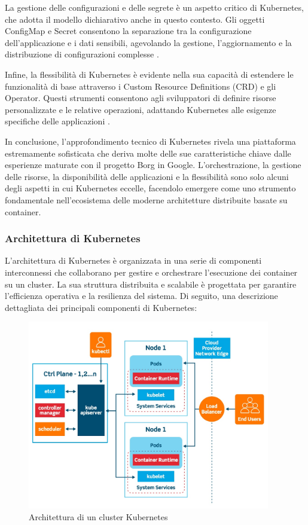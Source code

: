 La gestione delle configurazioni e delle segrete è un aspetto critico di Kubernetes, che adotta il modello dichiarativo anche in questo contesto. Gli oggetti ConfigMap e Secret consentono la separazione tra la configurazione dell'applicazione e i dati sensibili, agevolando la gestione, l'aggiornamento e la distribuzione di configurazioni complesse \cite{hightower2017kubernetes}.

Infine, la flessibilità di Kubernetes è evidente nella sua capacità di estendere le funzionalità di base attraverso i Custom Resource Definitions (CRD) e gli Operator. Questi strumenti consentono agli sviluppatori di definire risorse personalizzate e le relative operazioni, adattando Kubernetes alle esigenze specifiche delle applicazioni \cite{burns2016borg}.

In conclusione, l'approfondimento tecnico di Kubernetes rivela una piattaforma estremamente sofisticata che deriva molte delle sue caratteristiche chiave dalle esperienze maturate con il progetto Borg in Google. L'orchestrazione, la gestione delle risorse, la disponibilità delle applicazioni e la flessibilità sono solo alcuni degli aspetti in cui Kubernetes eccelle, facendolo emergere come uno strumento fondamentale nell'ecosistema delle moderne architetture distribuite basate su container.

\subsubsection{Architettura di Kubernetes}

L'architettura di Kubernetes è organizzata in una serie di componenti interconnessi che collaborano per gestire e orchestrare l'esecuzione dei container su un cluster. La sua struttura distribuita e scalabile è progettata per garantire l'efficienza operativa e la resilienza del sistema. Di seguito, una descrizione dettagliata dei principali componenti di Kubernetes:

\begin{figure}[h]
    \centering
    \includegraphics[width=400px]{figures/ch3/kube-arch.jpg}
    \caption[Architettura di un cluster Kubernetes]{Architettura di un cluster Kubernetes}
    \label{fig:cha3:k8s}
\end{figure}

